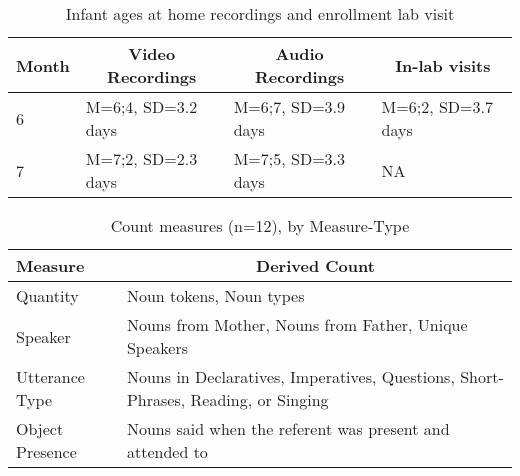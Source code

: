 \documentclass[man]{apa6}
\theoremstyle{definition}
\theoremstyle{definition}
\theoremstyle{definition}
\theoremstyle{remark}
\begin{document}
\begin{table}[tbp]
\begin{center}
\begin{threeparttable}
\caption{\label{tab:recording-ages-table}Infant ages at home recordings and enrollment lab visit}
\begin{tabular}{llll}
\toprule
Month & \multicolumn{1}{c}{Video Recordings} & \multicolumn{1}{c}{Audio Recordings} & \multicolumn{1}{c}{In-lab visits}\\
\midrule
6 & M=6;4, SD=3.2 days & M=6;7, SD=3.9 days & M=6;2, SD=3.7 days\\
7 & M=7;2, SD=2.3 days & M=7;5, SD=3.3 days & NA\\
\bottomrule
\end{tabular}
\end{threeparttable}
\end{center}
\end{table}

\pagebreak

\begin{table}[tbp]
\begin{center}
\begin{threeparttable}
\caption{\label{tab:measures-tab}Count measures (n=12), by Measure-Type}
\small{
\begin{tabular}{ll}
\toprule
Measure & \multicolumn{1}{c}{Derived Count}\\
\midrule
Quantity & Noun tokens, Noun types\\
Speaker & Nouns from Mother, Nouns from Father, Unique Speakers\\
Utterance Type & Nouns in Declaratives, Imperatives, Questions, Short-Phrases, Reading, or Singing\\
Object Presence & Nouns said when the referent was present and attended to\\
\bottomrule
\end{tabular}
}
\end{threeparttable}
\end{center}
\end{table}

\pagebreak
\end{document}

